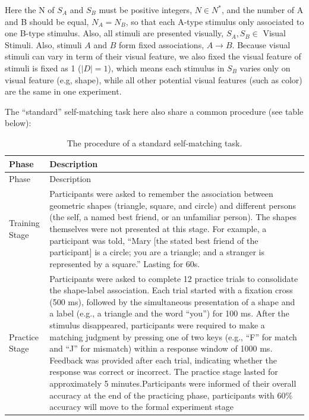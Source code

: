 \documentclass[
  english,
  man,floatsintext]{apa6}
\begin{document}
Here the N of \(S_A\) and \(S_B\) must be positive integers, \(N \in N^*\), and the number of A and B should be equal, \(N_A = N_B\), so that each A-type stimulus only associated to one B-type stimulus. Also, all stimuli are presented visually, \(S_A, S_B \in\) Visual Stimuli. Also, stimuli \(A\) and \(B\) form fixed associations, \(A \rightarrow B\). Because visual stimuli can vary in term of their visual feature, we also fixed the visual feature of stimuli is fixed as 1 (\(|D| = 1\)), which means each stimulus in \(S_B\) varies only on visual feature (e.g, shape), while all other potential visual features (such as color) are the same in one experiment.

The ``standard'' self-matching task here also share a common procedure (see table below):

\begin{longtable}[]{@{}
  >{\raggedright\arraybackslash}p{}
  >{\raggedright\arraybackslash}p{}@{}}
\caption{The procedure of a standard self-matching task.}\tabularnewline
\toprule\noalign{}
\begin{minipage}[b]{\linewidth}\raggedright
Phase
\end{minipage} & \begin{minipage}[b]{\linewidth}\raggedright
Description
\end{minipage} \\
\midrule\noalign{}
\endfirsthead
\toprule\noalign{}
\begin{minipage}[b]{\linewidth}\raggedright
Phase
\end{minipage} & \begin{minipage}[b]{\linewidth}\raggedright
Description
\end{minipage} \\
\midrule\noalign{}
\endhead
\bottomrule\noalign{}
\endlastfoot
Training Stage & Participants were asked to remember the association between geometric shapes (triangle, square, and circle) and different persons (the self, a named best friend, or an unfamiliar person). The shapes themselves were not presented at this stage. For example, a participant was told, ``Mary {[}the stated best friend of the participant{]} is a circle; you are a triangle; and a stranger is represented by a square.'' Lasting for 60s. \\
Practice Stage & Participants were asked to complete 12 practice trials to consolidate the shape-label association. Each trial started with a fixation cross (500 ms), followed by the simultaneous presentation of a shape and a label (e.g., a triangle and the word ``you'') for 100 ms. After the stimulus disappeared, participants were required to make a matching judgment by pressing one of two keys (e.g., ``F'' for match and ``J'' for mismatch) within a response window of 1000 ms. Feedback was provided after each trial, indicating whether the response was correct or incorrect. The practice stage lasted for approximately 5 minutes.Participants were informed of their overall accuracy at the end of the practicing phase, participants with 60\% accuracy will move to the formal experiment stage \\

\end{longtable}
\end{document}
